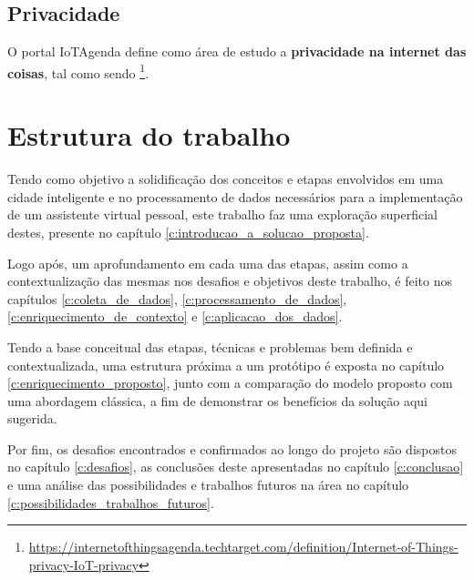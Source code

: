 \subsection{Privacidade} \label{ss:privacidade_na_internet_das_coisas}

O portal IoTAgenda define como área de estudo a \textbf{privacidade na internet das coisas}, tal como sendo  \footnote{\url{https://internetofthingsagenda.techtarget.com/definition/Internet-of-Things-privacy-IoT-privacy}}.

\section{Estrutura do trabalho} \label{s:estrutura_do_trabalho}

Tendo como objetivo a solidificação dos conceitos e etapas envolvidos em uma cidade inteligente e no processamento de dados necessários para a implementação de um assistente virtual pessoal, este trabalho faz uma exploração superficial destes, presente no capítulo \ref{c:introducao_a_solucao_proposta}.

Logo após, um aprofundamento em cada uma das etapas, assim como a contextualização das mesmas nos desafios e objetivos deste trabalho, é feito nos capítulos \ref{c:coleta_de_dados}, \ref{c:processamento_de_dados}, \ref{c:enriquecimento_de_contexto} e \ref{c:aplicacao_dos_dados}.

Tendo a base conceitual das etapas, técnicas e problemas bem definida e contextualizada, uma estrutura próxima a um protótipo é exposta no capítulo \ref{c:enriquecimento_proposto}, junto com a comparação do modelo proposto com uma abordagem clássica, a fim de demonstrar os benefícios da solução aqui sugerida.

Por fim, os desafios encontrados e confirmados ao longo do projeto são dispostos no capítulo \ref{c:desafios}, as conclusões deste apresentadas no capítulo \ref{c:conclusao} e uma análise das possibilidades e trabalhos futuros na área no capítulo \ref{c:possibilidades_trabalhos_futuros}.

